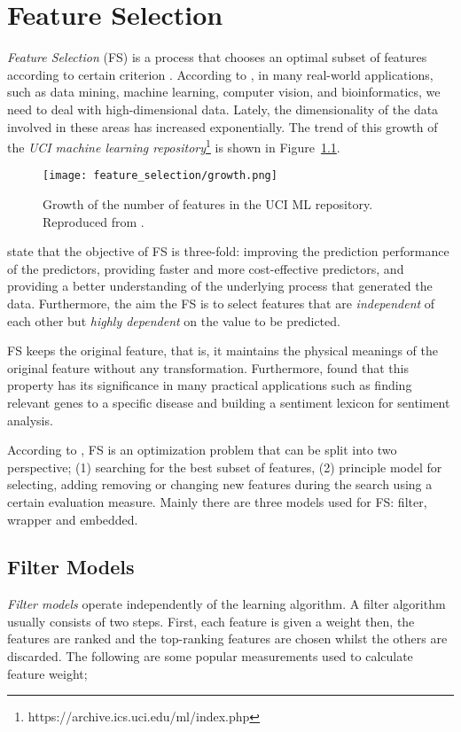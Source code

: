\chapter{Feature Selection}
\label{ch:feature-selection}

\textit{Feature Selection} (FS) is a process that chooses an optimal subset of features according to certain criterion \citep{liu2012feature}. According to \citet{sammut2017encyclopedia}, in many real-world applications, such as data mining, machine learning, computer vision, and bioinformatics, we need to deal with high-dimensional data. Lately, the dimensionality of the data involved in these areas has increased exponentially. The trend of this growth of the \textit{UCI machine learning repository}\footnote{https://archive.ics.uci.edu/ml/index.php} is shown in Figure~\ref{fig:fs_growth}.

\begin{figure}
  \texttt{[image: feature\_selection/growth.png]}
  \caption{Growth of the number of features in the UCI ML repository. Reproduced from \citet{sammut2017encyclopedia}.}
  \label{fig:fs_growth}
\end{figure}

\citet{guyon2003introduction} state that the objective of FS is three-fold: improving the prediction performance of the predictors, providing faster and more cost-effective predictors, and providing a better understanding of the underlying process that generated the data. Furthermore, the aim the FS is to select features that are \textit{independent} of each other but \textit{highly dependent} on the value to be predicted.

FS keeps the original feature, that is, it maintains the physical meanings of the original feature without any transformation. Furthermore, \citet{masaeli2010transformation} found that this property has its significance in many practical applications such as finding relevant genes to a specific disease and building a sentiment lexicon for sentiment analysis.

According to \citet{zhao2010advancing}, FS is an optimization problem that can be split into two perspective; (1) searching for the best subset of features, (2) principle model for selecting, adding removing or changing new features during the search using a certain evaluation measure. Mainly there are three models used for FS: filter, wrapper and embedded.

\section{Filter Models}\label{sec:fs_filter}
\textit{Filter models} operate independently of the learning algorithm. A filter algorithm usually consists of two steps. First, each feature is given a weight then, the features are ranked and the top-ranking features are chosen whilst the others are discarded. The following are some popular measurements used to calculate feature weight;

